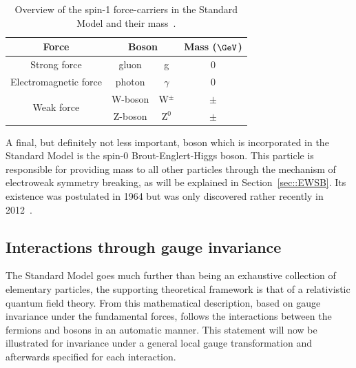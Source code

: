 \begin{table}[h!t]
 \centering
 \caption{Overview of the spin-1 force-carriers in the Standard Model and their mass~\cite{WMass,ZMass}.} \label{table::ForceCarriers}
 \begin{tabular}{|c|cc|c|}%
  \hline
  \textbf{Force} 		&\multicolumn{2}{c|}{\textbf{Boson}} 	& \textbf{Mass ($\GeV$)}	\\%
  \hline
  Strong force 			& gluon 	& g 			& 0 				\\%
  \hline
  Electromagnetic force		& photon 	& $\gamma$ 		& 0 				\\%
  \hline
  \multirow{2}{*}{Weak force} 	& W-boson 	& W$^{\pm}$ 		& $\pm$ 			\\%
				& Z-boson 	& Z$^{0}$ 		& $\pm$ 			\\%
  \hline
 \end{tabular}
\end{table}

A final, but definitely not less important, boson which is incorporated in the Standard Model is the spin-0 Brout-Englert-Higgs boson. This particle is responsible for providing mass to all other particles through the mechanism of electroweak symmetry breaking, as will be explained in Section~\ref{sec::EWSB}. Its existence was postulated in 1964 but was only discovered rather recently in 2012~\cite{HiggsDiscCMS, HiggsDiscAtlas}.

\subsection{Interactions through gauge invariance}
The Standard Model goes much further than being an exhaustive collection of elementary particles, the supporting theoretical framework is that of a relativistic quantum field theory.
From this mathematical description, based on gauge invariance under the fundamental forces, follows the interactions between the fermions and bosons in an automatic manner.
This statement will now be illustrated for invariance under a general local gauge transformation and afterwards specified for each interaction.
\\


